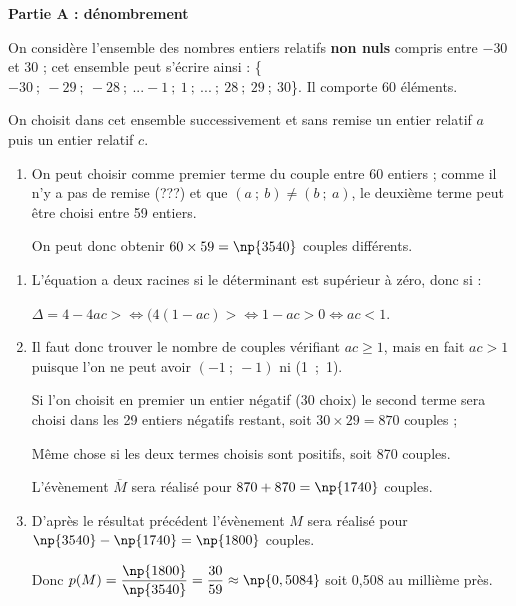 
\medskip

\textbf{Partie A : dénombrement}

On considère l'ensemble des nombres entiers relatifs \textbf{non nuls} compris entre $- 30$ et $30$ ; cet ensemble peut s'écrire ainsi : \{$- 30~;~- 29~;~- 28~;~ ... - 1~;~1~;~ ... ~;~ 28~;~29~;~30$\}. Il comporte 60 éléments.

On choisit dans cet ensemble successivement et sans remise un entier relatif $a$ puis un entier relatif $c$.

\medskip

\begin{enumerate}
\item %
On peut choisir comme premier terme du couple entre 60 entiers ;  comme il n'y a pas de remise (???) et que $(a~;~b) \ne (b~;~a)$, le deuxième terme peut être choisi entre 59 entiers.

On peut donc obtenir $60 \times 59 = \np{3540}$ couples différents.
\end{enumerate}


\begin{enumerate}[resume]
\item %
L'équation a deux racines si  le déterminant est supérieur à zéro, donc si :

$\Delta = 4 - 4ac >  \iff (4(1 - ac) > \iff 1 - ac > 0 \iff ac < 1$.
\item %
Il faut donc trouver le nombre de couples vérifiant $ac \geqslant 1$, mais en fait $ac > 1$ puisque l'on ne peut avoir $(-1~;~-1)$ ni (1~;~1).

Si l'on choisit en premier un entier négatif (30 choix) le second terme sera choisi dans les 29 entiers négatifs restant, soit $30 \times 29 = 870$ couples ;

Même chose si les deux termes choisis sont positifs, soit 870 couples.

L'évènement $\overline{M}$ sera réalisé pour $870 + 870 = \np{1740}$ couples.
\item %
D'après le résultat précédent l'évènement $M$ sera réalisé pour $\np{3540} - \np{1740} = \np{1800}$ couples.

Donc $p(M) = \dfrac{\np{1800}}{\np{3540}} = \dfrac{30}{59} \approx \np{0,5084}$ soit 0,508 au millième près.
\end{enumerate}


